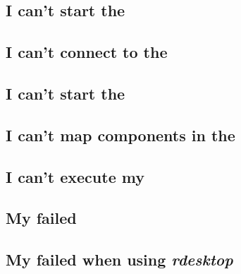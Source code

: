 



\subsection{I can't start the \gdagent}
\label{troublestartserver}


\subsection{I can't connect to the \gdagent}
\label{troubleconnectserver}


\subsection{I can't start the \gdaut{}}
\label{troublestartaut}


\subsection{I can't map components in the \gdomm}
\label{troubleobjectmapping}


\subsection{I can't execute my \gdsuite{}}
\label{troubleexecute}


\subsection{My \gdsuite{} failed}
\label{troublefailed}


\subsection{My \gdsuite{} failed when using \emph{rdesktop}}
\label{troublerdesktop}


